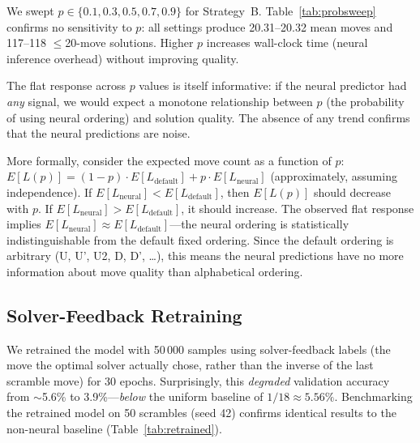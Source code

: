 \documentclass[conference]{IEEEtran}
\begin{document}
We swept $p \in \{0.1, 0.3, 0.5, 0.7, 0.9\}$ for Strategy~B. Table~\ref{tab:probsweep} confirms no sensitivity to $p$: all settings produce 20.31--20.32 mean moves and 117--118 $\leq$20-move solutions. Higher $p$ increases wall-clock time (neural inference overhead) without improving quality.

\begin{table}[htbp]
\centering
\caption{Strategy B sweep over $p$ (200 scrambles, seed 42, $K{=}5$).}
\label{tab:probsweep}
\end{table}

The flat response across $p$ values is itself informative: if the neural predictor had \emph{any} signal, we would expect a monotone relationship between $p$ (the probability of using neural ordering) and solution quality. The absence of any trend confirms that the neural predictions are noise.

More formally, consider the expected move count as a function of $p$: $E[L(p)] = (1-p) \cdot E[L_{\text{default}}] + p \cdot E[L_{\text{neural}}]$ (approximately, assuming independence). If $E[L_{\text{neural}}] < E[L_{\text{default}}]$, then $E[L(p)]$ should decrease with $p$. If $E[L_{\text{neural}}] > E[L_{\text{default}}]$, it should increase. The observed flat response implies $E[L_{\text{neural}}] \approx E[L_{\text{default}}]$---the neural ordering is statistically indistinguishable from the default fixed ordering. Since the default ordering is arbitrary (U, U', U2, D, D', \ldots), this means the neural predictions have no more information about move quality than alphabetical ordering.

\FloatBarrier
\subsection{Solver-Feedback Retraining}
\label{sec:retrained}

We retrained the model with 50\,000 samples using solver-feedback labels (the move the optimal solver actually chose, rather than the inverse of the last scramble move) for 30 epochs. Surprisingly, this \emph{degraded} validation accuracy from $\sim$5.6\% to 3.9\%---\emph{below} the uniform baseline of $1/18 \approx 5.56\%$. Benchmarking the retrained model on 50 scrambles (seed 42) confirms identical results to the non-neural baseline (Table~\ref{tab:retrained}).
\end{document}
